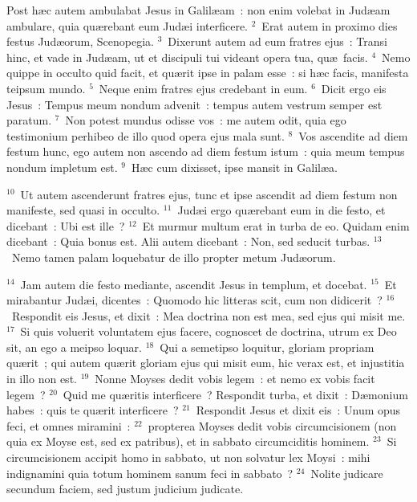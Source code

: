\lettrine[lines=10,image=true,loversize=0.05,lraise=-0.03]{P}{}ost h\ae c autem ambulabat Jesus in Galil\ae am~: non enim volebat in Jud\ae am ambulare, quia qu\ae rebant eum Jud\ae i interficere.
${}^{2}$~Erat autem in proximo dies festus Jud\ae orum, Scenopegia.
${}^{3}$~Dixerunt autem ad eum fratres ejus~: Transi hinc, et vade in Jud\ae am, ut et discipuli tui videant opera tua, qu\ae\ facis.
${}^{4}$~Nemo quippe in occulto quid facit, et qu\ae rit ipse in palam esse~: si h\ae c facis, manifesta teipsum mundo.
${}^{5}$~Neque enim fratres ejus credebant in eum.
${}^{6}$~Dicit ergo eis Jesus~: Tempus meum nondum advenit~: tempus autem vestrum semper est paratum.
${}^{7}$~Non potest mundus odisse vos~: me autem odit, quia ego testimonium perhibeo de illo quod opera ejus mala sunt.
${}^{8}$~Vos ascendite ad diem festum hunc, ego autem non ascendo ad diem festum istum~: quia meum tempus nondum impletum est.
${}^{9}$~H\ae c cum dixisset, ipse mansit in Galil\ae a.


${}^{10}$~Ut autem ascenderunt fratres ejus, tunc et ipse ascendit ad diem festum non manifeste, sed quasi in occulto.
${}^{11}$~Jud\ae i ergo qu\ae rebant eum in die festo, et dicebant~: Ubi est ille~?
${}^{12}$~Et murmur multum erat in turba de eo. Quidam enim dicebant~: Quia bonus est. Alii autem dicebant~: Non, sed seducit turbas.
${}^{13}$~Nemo tamen palam loquebatur de illo propter metum Jud\ae orum.


${}^{14}$~Jam autem die festo mediante, ascendit Jesus in templum, et docebat.
${}^{15}$~Et mirabantur Jud\ae i, dicentes~: Quomodo hic litteras scit, cum non didicerit~?
${}^{16}$~Respondit eis Jesus, et dixit~: Mea doctrina non est mea, sed ejus qui misit me.
${}^{17}$~Si quis voluerit voluntatem ejus facere, cognoscet de doctrina, utrum ex Deo sit, an ego a meipso loquar.
${}^{18}$~Qui a semetipso loquitur, gloriam propriam qu\ae rit~; qui autem qu\ae rit gloriam ejus qui misit eum, hic verax est, et injustitia in illo non est.
${}^{19}$~Nonne Moyses dedit vobis legem~: et nemo ex vobis facit legem~?
${}^{20}$~Quid me qu\ae ritis interficere~? Respondit turba, et dixit~: D\ae monium habes~: quis te qu\ae rit interficere~?
${}^{21}$~Respondit Jesus et dixit eis~: Unum opus feci, et omnes miramini~:
${}^{22}$~propterea Moyses dedit vobis circumcisionem (non quia ex Moyse est, sed ex patribus), et in sabbato circumciditis hominem.
${}^{23}$~Si circumcisionem accipit homo in sabbato, ut non solvatur lex Moysi~: mihi indignamini quia totum hominem sanum feci in sabbato~?
${}^{24}$~Nolite judicare secundum faciem, sed justum judicium judicate.


